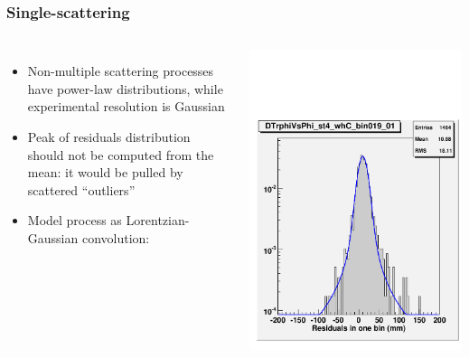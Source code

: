 \documentclass[compress]{beamer}
\begin{document}
\begin{frame}
\frametitle{Single-scattering}

\vspace{0.2 cm}
\begin{columns}

\begin{itemize}
\item Non-multiple scattering processes have power-law distributions, while experimental resolution is Gaussian

\item Peak of residuals distribution should not be computed from
  the mean: it would be pulled by scattered ``outliers''

\item Model process as Lorentzian-Gaussian convolution:
\end{itemize}
\includegraphics[width=\linewidth]{fitfunction.pdf}
\end{columns}


\end{frame}
\end{document}
